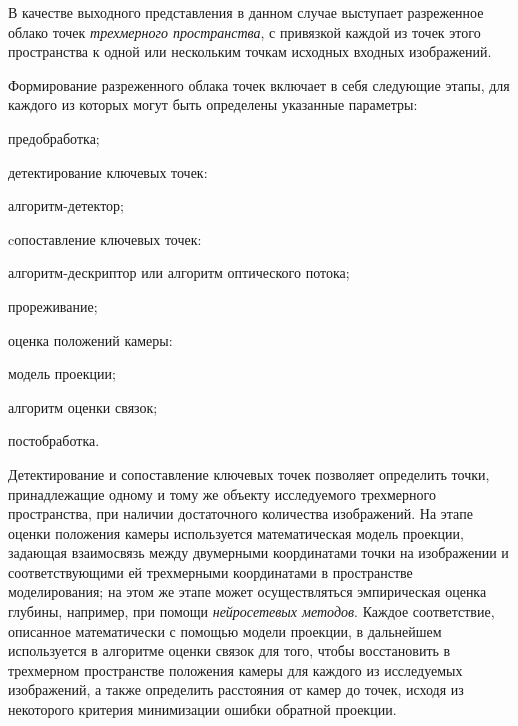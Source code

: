 В качестве выходного представления в данном случае выступает разреженное облако точек \textit{трехмерного пространства}, с привязкой каждой из точек этого пространства к одной или нескольким точкам исходных входных изображений.

Формирование разреженного облака точек включает в себя следующие этапы, для каждого из которых могут быть определены указанные параметры:
\begin{textitemize}
    \item предобработка;
    \item детектирование ключевых точек:
    \begin{textitemize}
        \item алгоритм-детектор;
    \end{textitemize}
    \item cопоставление ключевых точек:
    \begin{textitemize}
        \item алгоритм-дескриптор или алгоритм оптического потока;
        \item прореживание;
    \end{textitemize}
    \item оценка положений камеры:
    \begin{textitemize}
        \item модель проекции;
        \item алгоритм оценки связок;
    \end{textitemize}
    \item постобработка.
\end{textitemize}

Детектирование и сопоставление ключевых точек позволяет определить точки, принадлежащие одному и тому же объекту исследуемого трехмерного пространства, при наличии достаточного количества изображений. На этапе оценки положения камеры используется математическая модель проекции, задающая взаимосвязь между двумерными координатами точки на изображении и соответствующими ей трехмерными координатами в пространстве моделирования; на этом же этапе может осуществляться эмпирическая оценка глубины, например, при помощи \textit{нейросетевых методов}. Каждое соответствие, описанное математически с помощью модели проекции, в дальнейшем используется в алгоритме оценки связок для того, чтобы восстановить в трехмерном пространстве положения камеры для каждого из исследуемых изображений, а также определить расстояния от камер до точек, исходя из некоторого критерия минимизации ошибки обратной проекции.

